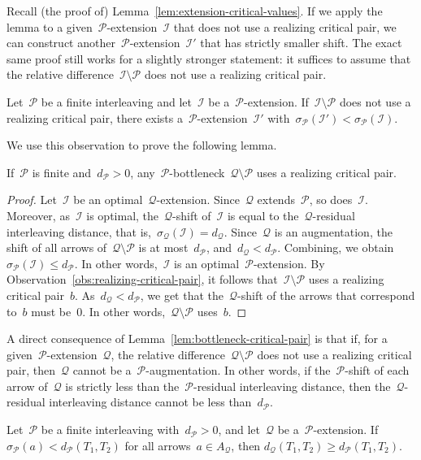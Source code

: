 \documentclass[a4paper,UKenglish, autoref, thm-restate, cleveref]{lipics-v2021}
\newcommand{\shift}[1]{\sigma_{#1}}
\newcommand{\resdist}[1]{d_{#1}}
\newcommand{\I}{\mathcal{I}}
\renewcommand{\P}{\mathcal{P}}
\newcommand{\Q}{\mathcal{Q}}
\begin{document}
Recall (the proof of) Lemma~\ref{lem:extension-critical-values}.
If we apply the lemma to a given~$\P$-extension~$\I$ that does not use a realizing critical pair, we can construct another~$\P$-extension~$\I'$ that has strictly smaller shift.
The exact same proof still works for a slightly stronger statement: it suffices to assume that the relative difference~$\I \setminus \P$ does not use a realizing critical pair.
\begin{observation}\label{obs:realizing-critical-pair}
Let~$\P$ be a finite interleaving and let~$\I$ be a~$\P$-extension.
If~$\I \setminus \P$ does not use a realizing critical pair, there exists a~$\P$-extension~$\I'$ with~$\shift{\P}(\I') < \shift{\P}(\I)$.
\end{observation}
We use this observation to prove the following lemma.

\begin{lemma}\label{lem:bottleneck-critical-pair}
    If~$\P$ is finite and~$\resdist{\P} > 0$, any~$\P$-bottleneck~$\Q \setminus \P$ uses a realizing critical pair.
\end{lemma}
\begin{proof}
    Let~$\I$ be an optimal~$\Q$-extension.
    Since~$\Q$ extends~$\P$, so does~$\I$.
    Moreover, as~$\I$ is optimal, the~$\Q$-shift of~$\I$ is equal to the~$\Q$-residual interleaving distance, that is,~$\shift{\Q}(\I) = \resdist{\Q}$.
    Since~$\Q$ is an augmentation, the shift of all arrows of~$\Q \setminus \P$ is at most~$\resdist{\P}$, and~$\resdist{\Q} < \resdist{\P}$.
    Combining, we obtain~$\shift{\P}(\I) \le \resdist{\P}$.
    In other words,~$\I$ is an optimal~$\P$-extension.
    By Observation~\ref{obs:realizing-critical-pair}, it follows that~$\I \setminus \P$ uses a realizing critical pair~$b$.
    As~$\resdist{\Q} < \resdist{\P}$, we get that the~$\Q$-shift of the arrows that correspond to~$b$ must be~$0$.
    In other words,~$\Q \setminus \P$ uses~$b$.
\end{proof}


\noindent
A direct consequence of Lemma~\ref{lem:bottleneck-critical-pair} is that if, for a given~$\P$-extension~$\Q$, the relative difference~$\Q \setminus \P$ does not use a realizing critical pair, then~$\Q$ cannot be a~$\P$-augmentation.
In other words, if the~$\P$-shift of each arrow of~$\Q$ is strictly less than the~$\P$-residual interleaving distance, then the~$\Q$-residual interleaving distance cannot be less than~$\resdist{\P}$.

\begin{corollary}\label{cor:helper-lemma}
    Let~$\P$ be a finite interleaving with~$\resdist{\P} > 0$, and let~$\Q$ be a~$\P$-extension.
    If~$\shift{\P}(a) < \resdist{\P}(T_1, T_2)$ for all arrows~$a \in A_\Q$, then $\resdist{\Q}(T_1, T_2) \ge \resdist{\P}(T_1, T_2)$.
\end{corollary}
\end{document}
